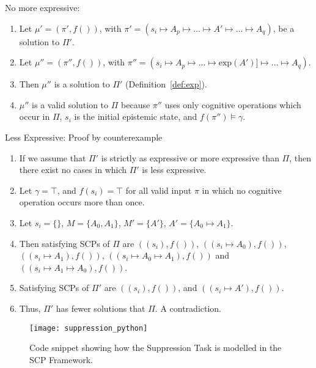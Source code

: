 \begin{bulletProof} \label{proof:aggregateExpressiveness}
\item No more expressive:
\begin{enumerate}
\item Let $\mu'=(\pi',f())$, with $\pi' = (s_i\longmapsto A_p \longmapsto ... \longmapsto A' \longmapsto ... \longmapsto A_q)$, be a solution to $\Pi'$.
\item Let $\mu''=(\pi'',f())$, with $\pi'' = (s_i\longmapsto A_p \longmapsto ... \longmapsto \text{exp}(A')] \longmapsto ... \longmapsto A_q)$.
\item Then $\mu''$ is a solution to $\Pi'$ (Definition~\ref{def:exp}).
\item $\mu''$ is a valid solution to $\Pi$ because $\pi''$ uses only cognitive operations which occur in $\Pi$, $s_i$ is the initial epistemic state, and $f(\pi'') \models \gamma$. 
\end{enumerate}
\item Less Expressive: Proof by counterexample
\begin{enumerate}
\item If we assume that $\Pi'$ is strictly as expressive or more expressive than $\Pi$, then there exist no cases in which $\Pi'$ is less expressive.
\item Let $\gamma = \top$, and $f(s_i)=\top$ for all valid input $\pi$ in which no cognitive operation occurs more than once.
\item Let $s_i=\{\}$, $M=\{A_0,A_1\}$, $M'=\{A'\}$, $A'=\{A_0\longmapsto A_1\}$.
\item Then satisfying SCPs of $\Pi$ are $((s_i),f())$, $((s_i \longmapsto A_0),f())$, $((s_i \longmapsto A_1),f())$, $((s_i \longmapsto A_0\longmapsto A_1),f())$ and $((s_i \longmapsto A_1\longmapsto A_0),f())$.
\item Satisfying SCPs of $\Pi'$ are $((s_i),f())$, and $((s_i \longmapsto A'),f())$.
\item Thus, $\Pi'$ has fewer solutions that $\Pi$. A contradiction.
\end{enumerate}
\end{bulletProof}


\begin{figure}
\centering \texttt{[image: suppression\_python]}
\caption{Code snippet showing how the Suppression Task is modelled in the SCP Framework.}
\label{fig:sup_snippet}
\end{figure}

\FloatBarrier

